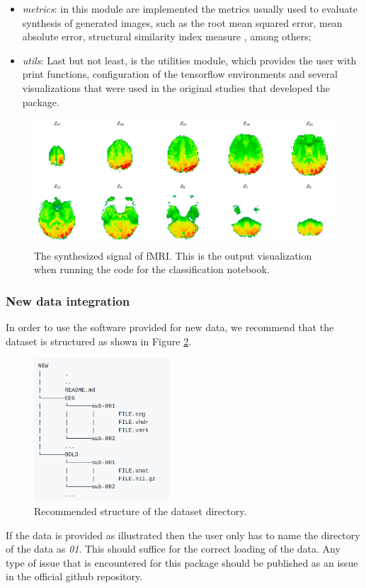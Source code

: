 \begin{itemize}
    \item \textit{metrics}: in this module are implemented the metrics usually used to evaluate synthesis of generated images, such as the root mean squared error, mean absolute error, structural similarity index measure \cite{wang2004image}, among others;
    \item \textit{utils}: Last but not least, is the utilities module, which provides the user with print functions, configuration of the tensorflow environments and several visualizations that were used in the original studies that developed the package.
\end{itemize}

\begin{figure}[t]
    \centering
    \includegraphics[width=\textwidth]{figures/sythesized.png}
    \caption{The synthesized signal of fMRI. This is the output visualization when running the code for the classification notebook.}
    \label{fig:synthesized}
\end{figure}

\subsubsection{New data integration}\label{section:new_data}

In order to use the software provided for new data, we recommend that the dataset is structured as shown in Figure \ref{fig:structure}.
\begin{figure}[ht]
    \centering
    \includegraphics[width=0.45\textwidth]{figures/structure.png}
    \caption{Recommended structure of the dataset directory.}
    \label{fig:structure}
\end{figure}
If the data is provided as illustrated then the user only has to name the directory of the data as \textit{01}. This should suffice for the correct loading of the data. Any type of issue that is encountered for this package should be published as an issue in the official github repository.

